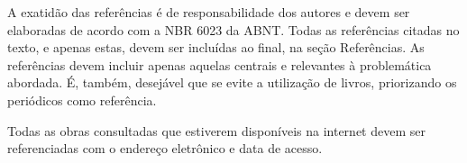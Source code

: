 \documentclass{modelo}
\begin{document}
 A exatidão das referências é de responsabilidade dos autores e devem ser elaboradas de acordo com a NBR 6023 da ABNT. 
Todas as referências citadas no texto, e apenas estas, devem ser incluídas ao final, na seção Referências. 
As referências devem incluir apenas aquelas centrais e relevantes à problemática abordada. É, também, desejável que se evite a utilização de livros, priorizando os periódicos como referência. 

Todas as obras consultadas que estiverem disponíveis na internet devem ser referenciadas com o endereço eletrônico e data de acesso. 

%	
%
%
% 
%
     
\end{document}

